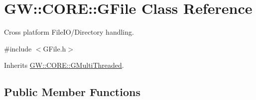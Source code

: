 \hypertarget{class_g_w_1_1_c_o_r_e_1_1_g_file}{}\section{GW\+:\+:C\+O\+RE\+:\+:G\+File Class Reference}
\label{class_g_w_1_1_c_o_r_e_1_1_g_file}


Cross platform File\+I\+O/\+Directory handling.  




{\ttfamily \#include $<$G\+File.\+h$>$}



Inherits \hyperlink{class_g_w_1_1_c_o_r_e_1_1_g_multi_threaded}{G\+W\+::\+C\+O\+R\+E\+::\+G\+Multi\+Threaded}.

\subsection*{Public Member Functions}
